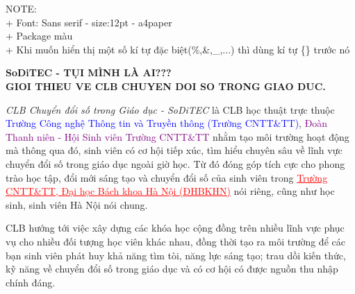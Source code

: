 \documentclass[a4paper, 12pt]{article}
\begin{document}
	\sffamily
	{
	\color{red}
	NOTE:\\
	+ Font: Sans serif - size:12pt - a4paper\\
	+ Package màu\\
	+ Khi muốn hiển thị một số kí tự đặc biệt(\%,\&,\_,...) thì dùng kí tự \{\} trước nó
	}
	\begin{center}
		\large
		\color{red}
		\bfseries
		SoDiTEC - TỤI MÌNH LÀ AI???\\
		\color{black}
		GIOI THIEU VE CLB CHUYEN DOI SO TRONG GIAO DUC.
	\end{center}
	\textit{CLB Chuyển đổi số trong Giáo dục - SoDiTEC} là CLB học thuật trực thuộc
	\textcolor{blue}{Trường Công nghệ Thông tin và Truyền thông (Trường CNTT\&TT)}, \textcolor{purple}{Đoàn
		Thanh niên - Hội Sinh viên Trường CNTT\&TT} nhằm tạo môi trường hoạt động
	mà thông qua đó, sinh viên có cơ hội tiếp xúc, tìm hiểu chuyên sâu về lĩnh
	vực chuyển đổi số trong giáo dục ngoài giờ học. Từ đó đóng góp tích cực
	cho phong trào học tập, đổi mới sáng tạo và chuyển đổi số của sinh viên trong
	\textcolor{red}{\uline{Trường CNTT\&TT, Đại học Bách khoa Hà Nội (ĐHBKHN)}} nói riêng, cũng như
	học sinh, sinh viên Hà Nội nói chung.
	\begin{flushright}
		\color{blue}
		CLB hướng tới việc xây dựng các khóa học cộng đồng trên nhiều lĩnh vực phục
		vụ cho nhiều đối tượng học viên khác nhau, đồng thời tạo ra môi trường để các
		bạn sinh viên phát huy khả năng tìm tòi, năng lực sáng tạo; trau dồi kiến thức,
		kỹ năng về chuyển đổi số trong giáo dục và có cơ hội có được nguồn thu nhập
		chính đáng.
	\end{flushright}
\end{document}
